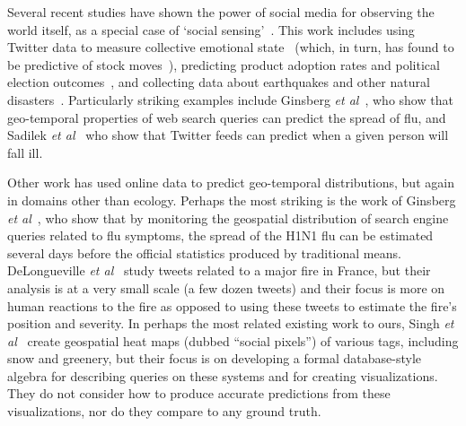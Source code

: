 Several recent studies have
shown the power of social media  for observing
the world itself, as a special case of
`social sensing'~\cite{Aggarwal:2013vh}.
This
work includes using Twitter data to measure collective emotional
state~\cite{Golder:2011cy} (which, in turn, has found to
be predictive of stock  moves~\cite{bollen11twitter}),
predicting product adoption rates and political election
outcomes~\cite{jin10prediction}, and collecting data about
earthquakes and other natural disasters~\cite{Sakaki:2010uv}.
Particularly striking examples include Ginsberg
\textit{et al}~\cite{ginsberg09flu}, who show that 
geo-temporal properties of web search queries can
predict the spread of flu, and 
Sadilek \textit{et al}~\cite{Sadilek:2012wp} who show that
Twitter feeds can predict when a given person will
fall ill.


Other work has used online data to predict geo-temporal distributions,
but again in domains other than ecology.  Perhaps the most
striking is the work of Ginsberg \textit{et al}~\cite{ginsberg09flu},
who show that by monitoring the geospatial distribution of search
engine queries related to flu symptoms, the spread of the H1N1
flu can be estimated several days before the official statistics produced by traditional
means.
DeLongueville \textit{et
  al}~\cite{delongueville09} study tweets related to a major fire in
France, but their analysis is at a very small scale (a few dozen
tweets) and their focus is more on human reactions to the fire as
opposed to using these tweets to estimate the fire's position and
severity.  In perhaps the most related existing work to ours,
 Singh \textit{et al}~\cite{singh10socialpixels} create
geospatial heat maps (dubbed ``social pixels'') of various
tags, including snow and greenery, but their focus is on developing a
formal database-style algebra for describing queries on these systems
and for creating visualizations. They do not consider how to produce
accurate predictions from these visualizations, nor do they compare to
any ground truth.

